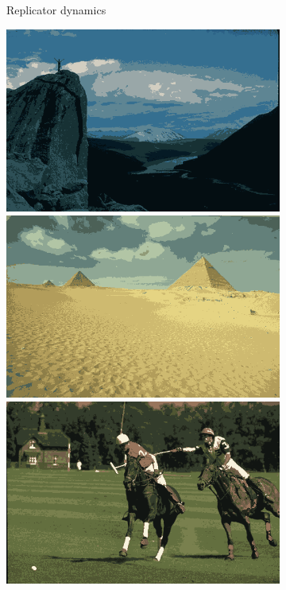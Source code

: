 \documentclass{beamer}
\begin{document}
\begin{frame}
\begin{figure}
\begin{subfigure}[b]{0.23\textwidth}
            \caption{Replicator dynamics}
        \end{subfigure}
        \hfill
        \begin{subfigure}[b]{0.23\textwidth}
            \centering
            \includegraphics[width=\textwidth]{../figures/methods/inimdyn/14037_avg.png}
            \includegraphics[width=\textwidth]{../figures/methods/inimdyn/260058_avg.png}
            \includegraphics[width=\textwidth]{../figures/methods/inimdyn/361010_avg.png}

\end{subfigure}
\end{figure}
\end{frame}
\end{document}
